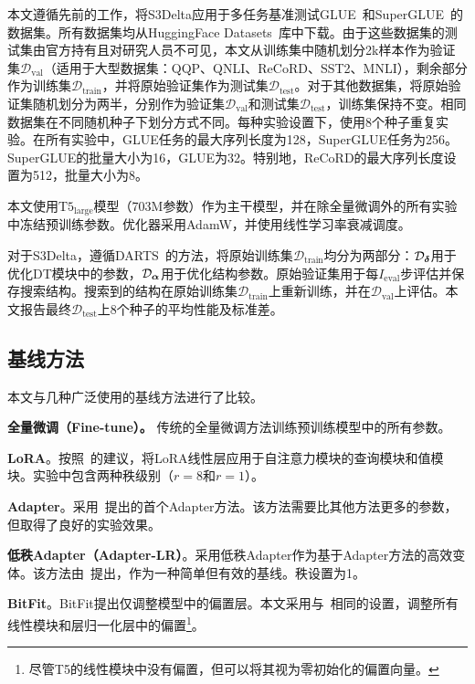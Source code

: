 \label{App:datasetsandptms}
本文遵循先前的工作，将S3Delta应用于多任务基准测试GLUE~\cite{wang2018glue}和SuperGLUE~\cite{NEURIPS2019_4496bf24}的数据集。所有数据集均从HuggingFace Datasets~\cite{lhoest2021datasets}库中下载。由于这些数据集的测试集由官方持有且对研究人员不可见，本文从训练集中随机划分2k样本作为验证集$\mathcal{D}_{\text{val}}$（适用于大型数据集：QQP、QNLI、ReCoRD、SST2、MNLI），剩余部分作为训练集$\mathcal{D}_{\text{train}}$，并将原始验证集作为测试集$\mathcal{D}_{\text{test}}$。对于其他数据集，将原始验证集随机划分为两半，分别作为验证集$\mathcal{D}_{\text{val}}$和测试集$\mathcal{D}_{\text{test}}$，训练集保持不变。相同数据集在不同随机种子下划分方式不同。每种实验设置下，使用8个种子重复实验。在所有实验中，GLUE任务的最大序列长度为128，SuperGLUE任务为256。SuperGLUE的批量大小为16，GLUE为32。特别地，ReCoRD的最大序列长度设置为512，批量大小为8。

本文使用$\text{T}5_{\text{large}}$模型（703M参数）作为主干模型，并在除全量微调外的所有实验中冻结预训练参数。优化器采用AdamW，并使用线性学习率衰减调度。

对于S3Delta，遵循DARTS~\cite{liu2018darts}的方法，将原始训练集$\mathcal{D}_{\text{train}}$均分为两部分：$\mathcal{D}_{\boldsymbol{\delta}}$用于优化DT模块中的参数，$\mathcal{D}_{\boldsymbol{\alpha}}$用于优化结构参数。原始验证集用于每$I_{\text{eval}}$步评估并保存搜索结构。搜索到的结构在原始训练集$\mathcal{D}_{\text{train}}$上重新训练，并在$\mathcal{D}_{\text{val}}$上评估。本文报告最终$\mathcal{D}_{\text{test}}$上8个种子的平均性能及标准差。
\subsection{基线方法}

本文与几种广泛使用的基线方法进行了比较。

\noindent\textbf{全量微调（Fine-tune）。} 传统的全量微调方法训练预训练模型中的所有参数。

\noindent\textbf{LoRA}。按照~\citet{hu2021lora}的建议，将LoRA线性层应用于自注意力模块的查询模块和值模块。实验中包含两种秩级别（$r=8$和$r=1$）。

\noindent\textbf{Adapter}。采用~\citet{houlsby2019parameter}提出的首个Adapter方法。该方法需要比其他方法更多的参数，但取得了良好的实验效果。

\noindent\textbf{低秩Adapter（Adapter-LR）}。采用低秩Adapter作为基于Adapter方法的高效变体。该方法由~\citet{mahabadi2021compacter}提出，作为一种简单但有效的基线。秩设置为1。

\noindent\textbf{BitFit}。BitFit提出仅调整模型中的偏置层。本文采用与~\citet{zaken2021bitfit}相同的设置，调整所有线性模块和层归一化层中的偏置\footnote{尽管T5的线性模块中没有偏置，但可以将其视为零初始化的偏置向量。}。

